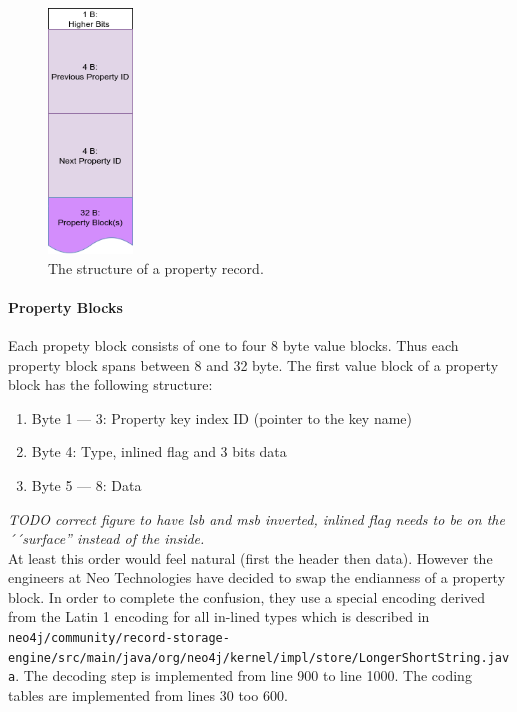 \documentclass[a4paper,10pt]{article}
\begin{document}
            \begin{figure}[htp]\label{prop}
                \begin{center}
                    \includegraphics[keepaspectratio,height=0.2\textheight,width=0.2\textwidth]{img/03_record/property/property.png}
                \end{center}
                \caption{The structure of a property record.} %
            \end{figure}
            
          \paragraph{Property Blocks} 
            Each propety block consists of one to four 8 byte value blocks.
            Thus each property block spans between 8 and 32 byte.
            The first value block of a property block has the following structure:
            \begin{enumerate}
                \item Byte 1 --- 3: Property key index ID (pointer to the key name)
                \item Byte 4: Type, inlined flag and 3 bits data
                \item Byte 5 --- 8: Data
            \end{enumerate}
            \textit{TODO correct figure to have lsb and msb inverted, inlined flag needs to be on the ´´surface'' instead of the inside.} \\
            
            At least this order would feel natural (first the header then data).
            However the engineers at Neo Technologies have decided to swap the endianness of a property block.
            In order to complete the confusion, they use a special encoding derived from the Latin 1 encoding for all in-lined types which is described in \texttt{neo4j/community/record-storage-engine/src/main/java/org/neo4j/kernel/impl/store/LongerShortString.java}.
            The decoding step is implemented from line 900 to line 1000.
            The coding tables are implemented from lines 30 too 600.
            
\end{document}

